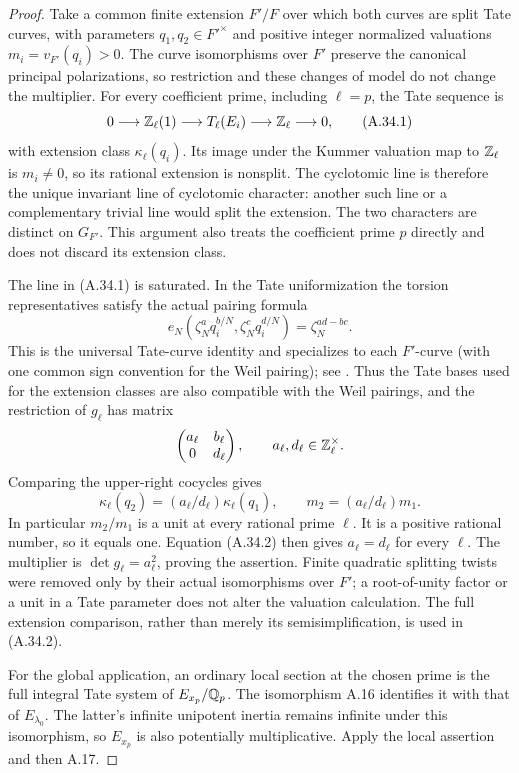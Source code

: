 \begin{proof}
Take a common finite extension $F'/F$ over which both curves are split
Tate curves, with parameters $q_1,q_2\in F'^\times$ and positive
integer normalized valuations $m_i=v_{F'}(q_i)>0$.  The curve
isomorphisms over $F'$ preserve the canonical principal polarizations,
so restriction and these changes of model do not change the multiplier.
For every coefficient prime, including $\ell=p$, the Tate sequence is
\[
       0\longrightarrow\mathbb Z_\ell(1)\longrightarrow
        T_\ell(E_i)\longrightarrow\mathbb Z_\ell\longrightarrow0,
\tag{A.34.1}
\]
with extension class $\kappa_\ell(q_i)$.  Its image under the Kummer
valuation map to $\mathbb Z_\ell$ is $m_i\ne0$, so its rational extension
is nonsplit.  The cyclotomic line is therefore the unique invariant
line of cyclotomic character: another such line or a complementary
trivial line would split the extension.  The two characters are
distinct on $G_{F'}$.  This argument also treats the coefficient prime
$p$ directly and does not discard its extension class.

The line in (A.34.1) is saturated.  In the Tate uniformization the
torsion representatives satisfy the actual pairing formula
\[
 e_N(\zeta_N^a q_i^{b/N},\zeta_N^c q_i^{d/N})
                         =\zeta_N^{ad-bc}.
\]
This is the universal Tate-curve identity and specializes to each
$F'$-curve (with one common sign convention for the Weil pairing);
see \cite[\S19.2]{LegIovitaMasdeu2009}.
Thus the Tate bases used for the extension classes are also compatible
with the Weil pairings, and the restriction of $g_\ell$ has matrix
\[
                \begin{pmatrix}a_\ell&b_\ell\\0&d_\ell\end{pmatrix},
                    \qquad a_\ell,d_\ell\in\mathbb Z_\ell^\times.
\]
Comparing the upper-right cocycles gives
\[
       \kappa_\ell(q_2)=(a_\ell/d_\ell)\kappa_\ell(q_1),
       \qquad m_2=(a_\ell/d_\ell)m_1.
\tag{A.34.2}
\]
In particular $m_2/m_1$ is a unit at every rational prime $\ell$.
It is a positive rational number, so it equals one.  Equation
(A.34.2) then gives $a_\ell=d_\ell$ for every $\ell$.  The multiplier
is $\det g_\ell=a_\ell^2$, proving the assertion.  Finite quadratic
splitting twists were removed only by their actual isomorphisms over
$F'$; a root-of-unity factor or a unit in a Tate parameter does not
alter the valuation calculation.  The full extension comparison,
rather than merely its semisimplification, is used in (A.34.2).

For the global application, an ordinary local section at the chosen
prime is the full integral Tate system of $E_{x_p}/\mathbb Q_p$.  The
isomorphism A.16 identifies it with that of $E_{\lambda_0}$.
The latter's infinite unipotent inertia remains infinite under this
isomorphism, so $E_{x_p}$ is also potentially multiplicative.
Apply the local assertion and then A.17.
\end{proof}

